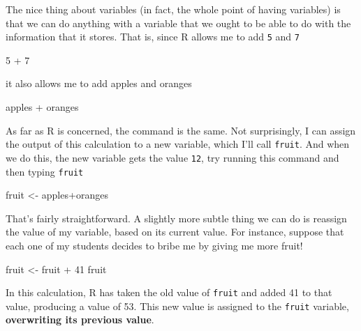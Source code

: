 \documentclass[
]{book}
\newenvironment{Shaded}{\begin{snugshade}}{\end{snugshade}}
\newcommand{\DecValTok}[1]{\textcolor[rgb]{0.00,0.00,0.81}{#1}}
\newcommand{\NormalTok}[1]{#1}
\newcommand{\OtherTok}[1]{\textcolor[rgb]{0.56,0.35,0.01}{#1}}
\newcommand{\SpecialCharTok}[1]{\textcolor[rgb]{0.00,0.00,0.00}{#1}}
\begin{document}
The nice thing about variables (in fact, the whole point of having variables) is that we can do anything with a variable that we ought to be able to do with the information that it stores. That is, since R allows me to add \texttt{5} and \texttt{7}

\begin{Shaded}
\begin{Highlighting}[]
\DecValTok{5} \SpecialCharTok{+} \DecValTok{7}
\end{Highlighting}
\end{Shaded}

it also allows me to add apples and oranges

\begin{Shaded}
\begin{Highlighting}[]
\NormalTok{apples }\SpecialCharTok{+}\NormalTok{ oranges}
\end{Highlighting}
\end{Shaded}

As far as R is concerned, the command is the same. Not surprisingly, I can assign the output of this calculation to a new variable, which I'll call \texttt{fruit}. And when we do this, the new variable gets the value \texttt{12}, try running this command and then typing \texttt{fruit}

\begin{Shaded}
\begin{Highlighting}[]
\NormalTok{fruit }\OtherTok{\textless{}{-}}\NormalTok{ apples}\SpecialCharTok{+}\NormalTok{oranges}
\end{Highlighting}
\end{Shaded}

That's fairly straightforward. A slightly more subtle thing we can do is reassign the value of my variable, based on its current value. For instance, suppose that each one of my students decides to bribe me by giving me more fruit!

\begin{Shaded}
\begin{Highlighting}[]
\NormalTok{fruit }\OtherTok{\textless{}{-}}\NormalTok{ fruit }\SpecialCharTok{+} \DecValTok{41}
\NormalTok{fruit}
\end{Highlighting}
\end{Shaded}

In this calculation, R has taken the old value of \texttt{fruit} and added 41 to that value, producing a value of 53. This new value is assigned to the \texttt{fruit} variable, \textbf{overwriting its previous value}.
\end{document}
